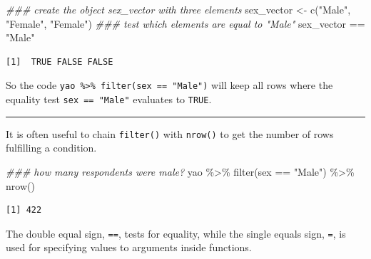 \documentclass[
  letterpaper,
  DIV=11,
  numbers=noendperiod]{scrreprt}
\newenvironment{Shaded}{\begin{snugshade}}{\end{snugshade}}
\newcommand{\DocumentationTok}[1]{\textcolor[rgb]{0.37,0.37,0.37}{\textit{#1}}}
\newcommand{\FunctionTok}[1]{\textcolor[rgb]{0.28,0.35,0.67}{#1}}
\newcommand{\NormalTok}[1]{\textcolor[rgb]{0.00,0.23,0.31}{#1}}
\newcommand{\OtherTok}[1]{\textcolor[rgb]{0.00,0.23,0.31}{#1}}
\newcommand{\SpecialCharTok}[1]{\textcolor[rgb]{0.37,0.37,0.37}{#1}}
\newcommand{\StringTok}[1]{\textcolor[rgb]{0.13,0.47,0.30}{#1}}
\begin{document}
\begin{Shaded}
\begin{Highlighting}[]
\DocumentationTok{\#\#\# create the object \textasciigrave{}sex\_vector\textasciigrave{} with three elements}
\NormalTok{sex\_vector }\OtherTok{\textless{}{-}} \FunctionTok{c}\NormalTok{(}\StringTok{"Male"}\NormalTok{, }\StringTok{"Female"}\NormalTok{, }\StringTok{"Female"}\NormalTok{)}
\DocumentationTok{\#\#\# test which elements are equal to "Male"}
\NormalTok{sex\_vector }\SpecialCharTok{==} \StringTok{"Male"}
\end{Highlighting}
\end{Shaded}

\begin{verbatim}
[1]  TRUE FALSE FALSE
\end{verbatim}

So the code \texttt{yao\ \%\textgreater{}\%\ filter(sex\ ==\ "Male")}
will keep all rows where the equality test \texttt{sex\ ==\ "Male"}
evaluates to \texttt{TRUE}.

\begin{center}\rule{0.5\linewidth}{0.5pt}\end{center}

It is often useful to chain \texttt{filter()} with \texttt{nrow()} to
get the number of rows fulfilling a condition.

\begin{Shaded}
\begin{Highlighting}[]
\DocumentationTok{\#\#\# how many respondents were male?}
\NormalTok{yao }\SpecialCharTok{\%\textgreater{}\%} 
  \FunctionTok{filter}\NormalTok{(sex }\SpecialCharTok{==} \StringTok{"Male"}\NormalTok{) }\SpecialCharTok{\%\textgreater{}\%} 
  \FunctionTok{nrow}\NormalTok{()}
\end{Highlighting}
\end{Shaded}

\begin{verbatim}
[1] 422
\end{verbatim}

\begin{tcolorbox}[enhanced jigsaw, colframe=quarto-callout-note-color-frame, rightrule=.15mm, opacityback=0, breakable, coltitle=black, colbacktitle=quarto-callout-note-color!10!white, bottomrule=.15mm, leftrule=.75mm, toprule=.15mm, arc=.35mm, bottomtitle=1mm, colback=white, left=2mm, opacitybacktitle=0.6, titlerule=0mm, title=\textcolor{quarto-callout-note-color}{\faInfo}\hspace{0.5em}{Key Point}, toptitle=1mm]

The double equal sign, \texttt{==}, tests for equality, while the single
equals sign, \texttt{=}, is used for specifying values to arguments
inside functions.

\end{tcolorbox}
\end{document}
